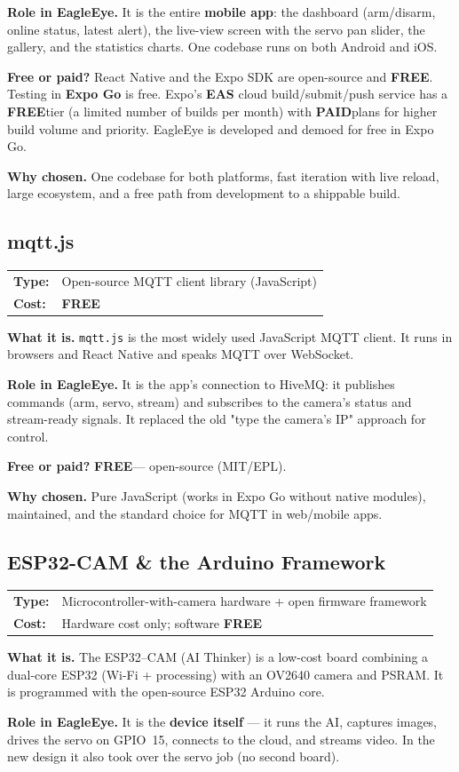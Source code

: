 \documentclass[11pt,a4paper]{article}
\makeatletter
\newcommand{\code}[1]{\texttt{#1}}
\newcommand{\free}{\textbf{\color{freegreen}FREE}}
\newcommand{\paid}{\textbf{\color{paidorange}PAID}}
\newcommand{\techhead}[2]{\par\vspace{0.3em}\noindent
  \begin{tabularx}{\linewidth}{@{}lX@{}}
  \textbf{Type:} & #1 \\
  \textbf{Cost:} & #2 \\
  \end{tabularx}\par\vspace{0.3em}}
\makeatother
\begin{document}
\textbf{Role in EagleEye.} It is the entire \textbf{mobile app}: the dashboard (arm/disarm,
online status, latest alert), the live-view screen with the servo pan slider, the gallery, and
the statistics charts. One codebase runs on both Android and iOS.

\textbf{Free or paid?} React Native and the Expo SDK are open-source and \free. Testing in
\textbf{Expo Go} is free. Expo's \textbf{EAS} cloud build/submit/push service has a \free tier
(a limited number of builds per month) with \paid plans for higher build volume and priority.
EagleEye is developed and demoed for free in Expo Go.

\textbf{Why chosen.} One codebase for both platforms, fast iteration with live reload, large
ecosystem, and a free path from development to a shippable build.

\subsection{mqtt.js}
\techhead{Open-source MQTT client library (JavaScript)}{\free}
\textbf{What it is.} \code{mqtt.js} is the most widely used JavaScript MQTT client. It runs in
browsers and React Native and speaks MQTT over WebSocket.

\textbf{Role in EagleEye.} It is the app's connection to HiveMQ: it publishes commands
(arm, servo, stream) and subscribes to the camera's status and stream-ready signals. It
replaced the old "type the camera's IP" approach for control.

\textbf{Free or paid?} \free --- open-source (MIT/EPL).

\textbf{Why chosen.} Pure JavaScript (works in Expo Go without native modules), maintained, and
the standard choice for MQTT in web/mobile apps.

\subsection{ESP32-CAM \& the Arduino Framework}
\techhead{Microcontroller-with-camera hardware + open firmware framework}{Hardware cost only; software \free}
\textbf{What it is.} The ESP32--CAM (AI Thinker) is a low-cost board combining a dual-core
ESP32 (Wi-Fi + processing) with an OV2640 camera and PSRAM. It is programmed with the
open-source ESP32 Arduino core.

\textbf{Role in EagleEye.} It is the \textbf{device itself} --- it runs the AI, captures
images, drives the servo on GPIO~15, connects to the cloud, and streams video. In the new
design it also took over the servo job (no second board).
\end{document}
